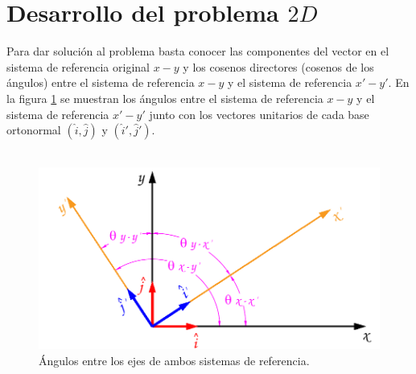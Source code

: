 \documentclass[12pt,letterpaper]{article}
\begin{document}
\section{Desarrollo del problema $2D$}
%
Para dar solución al problema basta conocer las componentes del vector en el sistema de referencia original $x-y$ y los cosenos directores  (cosenos de los ángulos) entre el sistema de referencia $x-y$ y el sistema de referencia $x'-y'$. En la figura \ref{direc2d} se muestran los ángulos entre el sistema de referencia $x-y$ y el sistema de referencia $x'-y'$ junto con los vectores unitarios de cada base ortonormal $\left( \hat{i}, \hat{j} \right)$ y $\left( \hat{i}', \hat{j}' \right)$.\\\\
%
%
\begin{figure}[H]
	\centering
	\includegraphics[width=15cm]{img/Directores2D.pdf}
	\caption{Ángulos entre los ejes de ambos sistemas de referencia.}
	\label{direc2d}
\end{figure}
\end{document}

